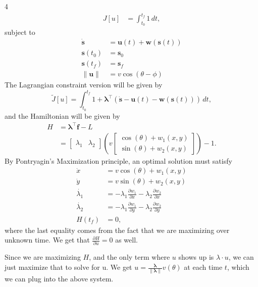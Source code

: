 \documentclass[a0]{a0poster}
\newcommand{\NumColumns}{4}
\begin{document}
\begin{minipage}{\linewidth}
\begin{multicols*}{\NumColumns}
\begin{align*}
    J[u] &= \int_{t_0}^{t_f} 1 \,dt,
\end{align*}
subject to
\begin{align*}
\dot{\mathbf{s}} &= \mathbf{u}(t) + \mathbf{w}(\mathbf{s}(t))\\
    \mathbf{s}(t_0) &= \mathbf{s}_0\\
    \mathbf{s}(t_f) &= \mathbf{s}_f \\ 
    \| \mathbf{u} \| &= v \cos(\theta - \phi)
\end{align*}
The Lagrangian constraint version will be given by
\[
    \tilde{J}[u] = \int_{t_0}^{t_f} 1 + \boldsymbol{\lambda}^\top (\dot{\mathbf{s}} - \mathbf{u}(t) - \mathbf{w}(\mathbf{s}(t))) \,dt,
\]
and the Hamiltonian will be given by
\begin{align*}
H &= \boldsymbol{\lambda}^\top \mathbf{f} - L \\
  &= \begin{bmatrix} \lambda_1 & \lambda_2 \end{bmatrix}
     \left( v \begin{bmatrix} \cos(\theta) + w_1(x, y) \\ \sin(\theta) + w_2(x, y) \end{bmatrix} \right) - 1.
\end{align*}
By Pontryagin's Maximization principle, an optimal solution must satisfy
\begin{align*}
\dot{x} &= v \cos(\theta) + w_1(x, y) \\
\dot{y} &= v \sin(\theta) + w_2(x, y) \\
\dot{\lambda_1} &= -\lambda_1 \frac{\partial w_1}{\partial x} -\lambda_2 \frac{\partial w_2}{\partial x} \\
\dot{\lambda_2} &= -\lambda_1 \frac{\partial w_1}{\partial y} -\lambda_2 \frac{\partial w_2}{\partial y} \\
H(t_f) &= 0,
\end{align*}
where the last equality comes from the fact that we are maximizing over unknown time. We get that $\frac{\partial H}{\partial u} = 0$ as well.

\par Since we are maximizing $H$, and the only term where $u$ shows up is $\lambda \cdot u$, we can just maximize that to solve for u. We get $u = \frac{\boldsymbol{\lambda}}{\| \boldsymbol{\lambda} \|} v(\theta)$ at each time $t$, which we can plug into the above system.



\end{multicols*}
\end{minipage}
\end{document}
